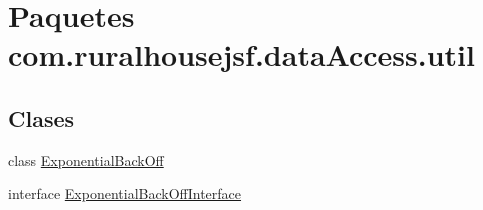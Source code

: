 \hypertarget{a00113}{}\section{Paquetes com.\+ruralhousejsf.\+data\+Access.\+util}
\label{a00113}
\subsection*{Clases}
\begin{DoxyCompactItemize}
\item 
class \mbox{\hyperlink{a00156}{Exponential\+Back\+Off}}
\item 
interface \mbox{\hyperlink{a00160}{Exponential\+Back\+Off\+Interface}}
\end{DoxyCompactItemize}
